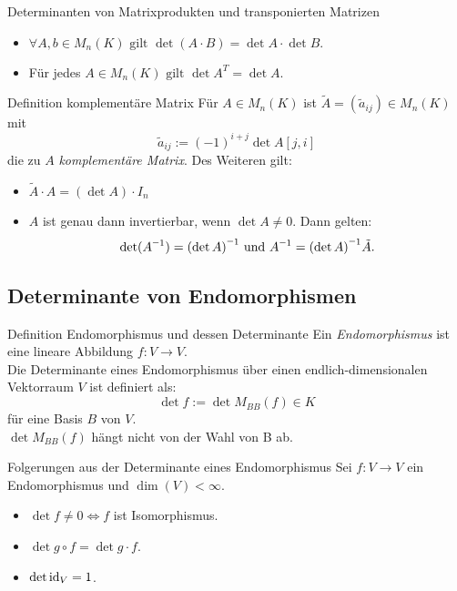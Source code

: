 \documentclass[main.tex]{subfiles}
\begin{document}
\begin{karte}{Determinanten von Matrixprodukten und transponierten Matrizen}
    \begin{itemize}
        \item \(\forall A,b \in M_n(K) \text{ gilt } 
        \det(A \cdot B) = \det A \cdot \det B.\)
        \item Für jedes \(A \in M_n(K) \text{ gilt } 
        \det A^T = \det A.\)
    \end{itemize}
\end{karte}
\begin{karte}{Definition komplementäre Matrix}
    Für \(A \in M_n(K)\) ist \(\tilde{A} = (\tilde{a}_{ij}) \in M_n(K)\) mit
    \[\tilde{a}_{ij} := (-1)^{i+j} \det A[j,i]\]
    die zu \(A\) \textit{komplementäre Matrix}.
    Des Weiteren gilt:
    \begin{itemize}
        \item \(\tilde{A} \cdot A = (\det A) \cdot I_n\)
        \item \(A\) ist genau dann invertierbar, wenn \(\det A \neq 0\). Dann gelten: 
        \[\det(\inverse A) = \inverse{(\det A)} \text{ und }
         \inverse A = \inverse{(\det A)} \tilde{A}.\]
    \end{itemize}
\end{karte}

\subsection*{Determinante von Endomorphismen}

\begin{karte}{Definition Endomorphismus und dessen Determinante}
    Ein \textit{Endomorphismus} ist eine lineare Abbildung 
    \(f: V \rightarrow V\).\\
    Die Determinante eines Endomorphismus über einen endlich-dimensionalen 
    Vektorraum \(V\) ist definiert als:
    \[\det f := \det M_{BB}(f) \in K\]
    für eine Basis \(B\) von \(V\).\\
    \(\det M_{BB}(f)\) hängt nicht von der Wahl von B ab. 
\end{karte}
\begin{karte}{Folgerungen aus der Determinante eines Endomorphismus}
    Sei \(f: V \rightarrow V\) ein Endomorphismus und \(\dim(V) < \infty\).
    \begin{itemize}
        \item \(\det f \neq 0 \Leftrightarrow f\) ist Isomorphismus.
        \item \(\det g \circ f = \det g \cdot f\).
        \item \(\det \operatorname{id}_V = 1\).
    \end{itemize}
\end{karte}
\end{document}
